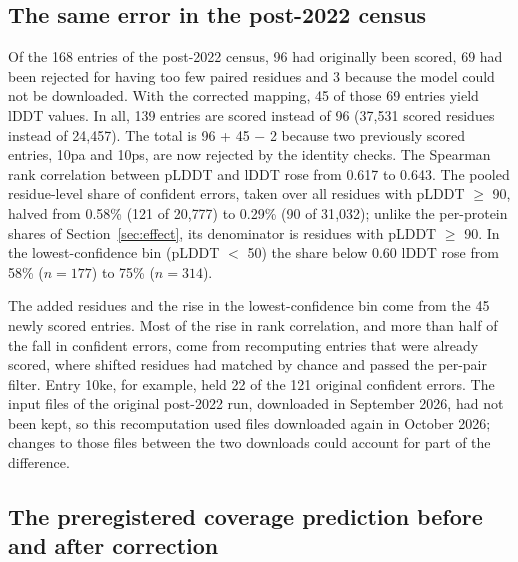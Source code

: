 \documentclass{article}
\begin{document}
\subsection{The same error in the post-2022 census}
\label{sec:post2022}

Of the 168 entries of the post-2022 census, 96 had originally been scored,
69 had been rejected for having too few paired residues and 3 because the
model could not be downloaded. With the corrected mapping, 45 of those 69
entries yield lDDT values. In all, 139 entries are scored instead of 96
(37{,}531 scored residues instead of 24{,}457). The total is 96 + 45 $-$ 2 because two previously scored
entries, 10pa and 10ps, are now rejected by the identity checks. The
Spearman rank correlation between pLDDT and lDDT rose from 0.617 to 0.643.
The pooled residue-level share of confident errors, taken over all residues
with pLDDT $\ge$ 90, halved from 0.58\% (121 of 20{,}777) to 0.29\% (90 of 31{,}032); unlike the per-protein shares of Section~\ref{sec:effect}, its denominator is residues with pLDDT $\ge$ 90. In the lowest-confidence bin (pLDDT $<$ 50) the share
below 0.60 lDDT rose from 58\% ($n = 177$) to 75\% ($n = 314$).

The added residues and the rise in the lowest-confidence bin come from the
45 newly scored entries. Most of the rise in rank correlation, and more
than half of the fall in confident errors, come from recomputing entries
that were already scored, where shifted residues had matched by chance and
passed the per-pair filter. Entry 10ke, for example, held 22 of the 121 original confident errors. The
input files of the original post-2022 run, downloaded in September 2026, had
not been kept, so this recomputation used files downloaded again in October
2026; changes to those files between the two downloads could account for
part of the difference.

\subsection{The preregistered coverage prediction before and after correction}
\label{sec:p5}
\end{document}
